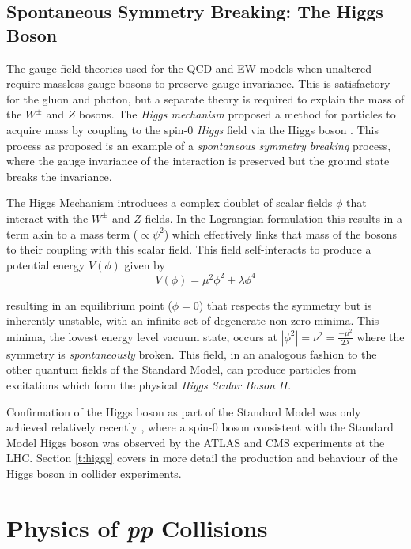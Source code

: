 	\subsection{Spontaneous Symmetry Breaking: The Higgs Boson}
	\label{t:symbreak}

	The gauge field theories used for the QCD and EW models when unaltered require massless gauge bosons to preserve gauge invariance. This is satisfactory for the gluon and photon, but a separate theory is required to explain the mass of the $W^\pm$ and $Z$ bosons. The \textit{Higgs mechanism} proposed a method for particles to acquire mass by coupling to the spin-$0$ \textit{Higgs} field via the Higgs boson \cite{gauge-boson-mass, higgs-1, higgs-2}. This process as proposed is an example of a \textit{spontaneous symmetry breaking} process, where the gauge invariance of the interaction is preserved but the ground state breaks the invariance.

	The Higgs Mechanism introduces a complex doublet of scalar fields $\phi$ that interact with the $W^\pm$ and $Z$ fields. In the Lagrangian formulation this results in a term akin to a mass term ($\propto\psi^2$) which effectively links that mass of the bosons to their coupling with this scalar field. This field self-interacts to produce a potential energy $V(\phi)$ given by
	 \begin{equation}
		 V(\phi) = \mu^2\phi^2 + \lambda\phi^4
	 \end{equation}

	 	resulting in an equilibrium point ($\phi=0$) that respects the symmetry but is inherently unstable, with an infinite set of degenerate non-zero minima. This minima, the lowest energy level vacuum state, occurs at $|\phi^2|=\nu^2=\frac{-\mu^2}{2\lambda}$ where the symmetry is \textit{spontaneously} broken. This field, in an analogous fashion to the other quantum fields of the Standard Model, can produce particles from excitations which form the physical \textit{Higgs Scalar Boson} $H$.

	 Confirmation of the Higgs boson as part of the Standard Model was only achieved relatively recently \cite{higgs-atlas, higgs-cms}, where a spin-$0$ boson consistent with the Standard Model Higgs boson was observed by the ATLAS and CMS experiments at the LHC. Section \ref{t:higgs} covers in more detail the production and behaviour of the Higgs boson in collider experiments.


\section{Physics of \textit{pp} Collisions}

